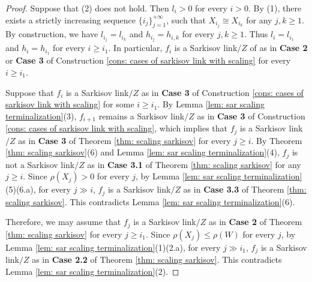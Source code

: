 \documentclass[11pt]{amsart}
\numberwithin{equation}{section}
\theoremstyle{definition}
\theoremstyle{remark}
\theoremstyle{definition}
\begin{document}
\begin{proof}
Suppose that (2) does not hold. Then $l_i>0$ for every $i>0$. By (1), there exists a strictly increasing sequence $\{i_j\}_{j=1}^{+\infty}$, such that $X_{i_j}\cong X_{i_k}$ for any $j,k\geq 1$.  By construction, we have $l_{i_j}=l_{i_k}$ and $h_{i_j}=h_{i,k}$ for every $j,k\geq 1$. Thus $l_i=l_{i_1}$ and $h_i=h_{i_1}$ for every $i\geq i_1$. In particular, $f_i$ is a Sarkisov link$/Z$ of as in \textbf{Case 2} or \textbf{Case 3} of Construction \ref{cons: cases of sarkisov link with scaling} for every $i\geq i_1$.

Suppose that $f_i$ is a Sarkisov link$/Z$ as in \textbf{Case 3} of Construction \ref{cons: cases of sarkisov link with scaling} for some $i\geq i_1$. By Lemma \ref{lem: sar scaling terminalization}(3), $f_{i+1}$ remains a Sarkisov link$/Z$ as in \textbf{Case 3} of  Construction \ref{cons: cases of sarkisov link with scaling}, which implies that $f_j$ is a Sarkisov link$/Z$ as in \textbf{Case 3} of Theorem \ref{thm: scaling sarkisov} for every $j\geq i$. By Theorem \ref{thm: scaling sarkisov}(6) and Lemma \ref{lem: sar scaling terminalization}(4), $f_j$ is not a Sarkisov link$/Z$ as in \textbf{Case 3.1} of Theorem \ref{thm: scaling sarkisov} for any $j\geq i$. Since $\rho(X_j)>0$ for every $j$, by Lemma \ref{lem: sar scaling terminalization}(5)(6.a), for every $j\gg i$,  $f_j$ is a Sarkisov link$/Z$ as in \textbf{Case 3.3} of Theorem \ref{thm: scaling sarkisov}. This contradicts Lemma \ref{lem: sar scaling terminalization}(6).

Therefore, we may assume that $f_j$ is a Sarkisov link$/Z$ as in \textbf{Case 2} of Theorem \ref{thm: scaling sarkisov} for every $j\geq i_1$. Since $\rho(X_j)\leq\rho(W)$ for every $j$, by Lemma \ref{lem: sar scaling terminalization}(1)(2.a), for every $j\gg i_1$, $f_j$ is a Sarkisov link$/Z$ as in \textbf{Case 2.2} of Theorem \ref{thm: scaling sarkisov}. This contradicts Lemma \ref{lem: sar scaling terminalization}(2).
\end{proof}
\end{document}
